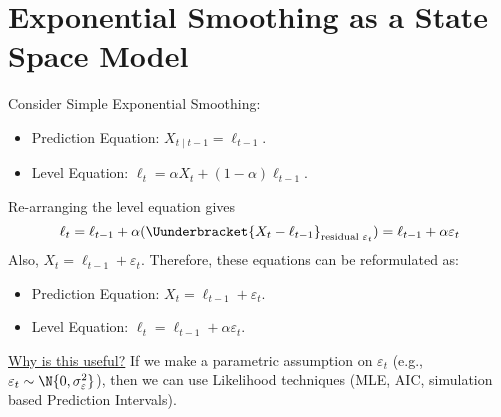 \section{Exponential Smoothing as a State Space Model}
Consider Simple Exponential Smoothing:
\begin{itemize}
      \item Prediction Equation: $ X_{t\mid t-1}=\ell_{t-1} $.
      \item Level Equation: $ \ell_t=\alpha X_t+(1-\alpha)\ell_{t-1} $.
\end{itemize}
Re-arranging the level equation gives
\[ \ell_t=\ell_{t-1}+\alpha(\Uunderbracket{X_t-\ell_{t-1}}_{\text{residual $ \varepsilon_t $}})=\ell_{t-1}+\alpha \varepsilon_t \]
Also, $ X_t=\ell_{t-1}+\varepsilon_t $. Therefore, these equations
can be reformulated as:
\begin{itemize}
      \item Prediction Equation: $ X_t=\ell_{t-1}+\varepsilon_t $.
      \item Level Equation: $ \ell_t=\ell_{t-1}+\alpha \varepsilon_t $.
\end{itemize}
\underline{Why is this useful?} If we make a parametric assumption
on $ \varepsilon_t $ (e.g., $ \varepsilon_t \sim \N{0,\sigma_{\varepsilon}^2} $),
then we can use Likelihood techniques (MLE, AIC, simulation based Prediction Intervals).

